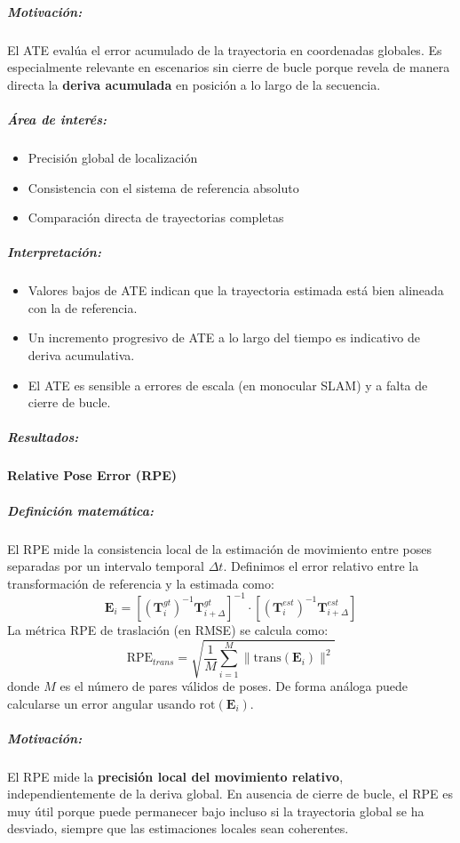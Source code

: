 \documentclass[12pt, a4paper, twoside]{article}
\begin{document}
\subparagraph{Motivación:}
El ATE evalúa el error acumulado de la trayectoria en coordenadas globales.
Es especialmente relevante en escenarios sin cierre de bucle porque 
revela de manera directa la \textbf{deriva acumulada} en posición a lo largo de la secuencia.

\subparagraph{Área de interés:}
\begin{itemize}
  \item Precisión global de localización
  \item Consistencia con el sistema de referencia absoluto
  \item Comparación directa de trayectorias completas
\end{itemize}

\subparagraph{Interpretación:}
\begin{itemize}
  \item Valores bajos de ATE indican que la trayectoria estimada está bien alineada con la de referencia.
  \item Un incremento progresivo de ATE a lo largo del tiempo es indicativo de deriva acumulativa.
  \item El ATE es sensible a errores de escala (en monocular SLAM) y a falta de cierre de bucle.
\end{itemize}

\subparagraph{Resultados:}

\paragraph{Relative Pose Error (RPE)}

\subparagraph{Definición matemática:}
El RPE mide la consistencia local de la estimación de movimiento entre poses 
separadas por un intervalo temporal $\Delta t$.
Definimos el error relativo entre la transformación de referencia y la estimada como:
\[
\mathbf{E}_i =
\left[
(\mathbf{T}^{gt}_i)^{-1}\mathbf{T}^{gt}_{i+\Delta}
\right]^{-1}
\cdot
\left[
(\mathbf{T}^{est}_i)^{-1}\mathbf{T}^{est}_{i+\Delta}
\right]
\]
La métrica RPE de traslación (en RMSE) se calcula como:
\[
\text{RPE}_{trans} =
\sqrt{\frac{1}{M}\sum_{i=1}^{M}
\|\mathrm{trans}(\mathbf{E}_i)\|^2 }
\]
donde $M$ es el número de pares válidos de poses.
De forma análoga puede calcularse un error angular usando $\mathrm{rot}(\mathbf{E}_i)$.

\subparagraph{Motivación:}
El RPE mide la \textbf{precisión local del movimiento relativo}, 
independientemente de la deriva global.
En ausencia de cierre de bucle, el RPE es muy útil porque 
puede permanecer bajo incluso si la trayectoria global se ha desviado,
siempre que las estimaciones locales sean coherentes.
\end{document}
